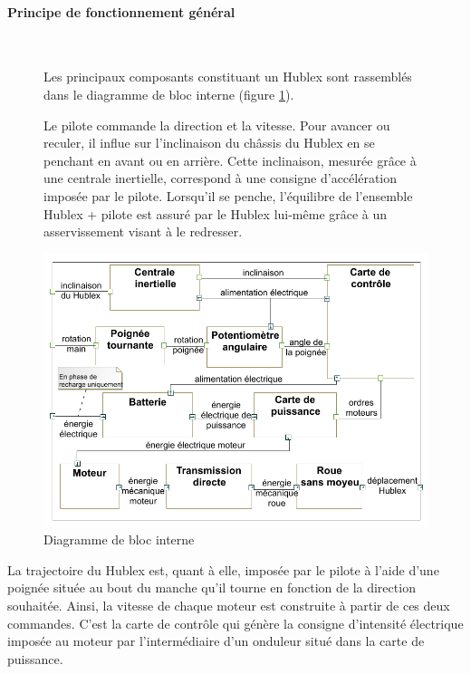 \paragraph{Principe de fonctionnement général}

~\

\begin{figure}[h!]
 \begin{minipage}{0.4\linewidth}
Les principaux composants constituant un Hublex sont rassemblés dans le diagramme de bloc interne
(figure \ref{fig05}).

Le pilote commande la direction et la vitesse. Pour avancer ou reculer, il influe sur l'inclinaison du
châssis du Hublex en se penchant en avant ou en arrière. Cette inclinaison, mesurée grâce à une centrale inertielle, correspond à une consigne d'accélération imposée par le pilote. Lorsqu'il se penche, l'équilibre de l'ensemble {Hublex + pilote} est assuré par le Hublex lui-même grâce à un asservissement visant à le redresser.
 \end{minipage}\hfill
 \begin{minipage}{0.55\linewidth}
 \includegraphics[width=\linewidth]{img/fig05}
 \caption{\label{fig05}Diagramme de bloc interne}
 \end{minipage}
\end{figure}


La trajectoire du Hublex est, quant à elle, imposée par le pilote à l'aide d'une poignée située au bout
du manche qu'il tourne en fonction de la direction souhaitée. Ainsi, la vitesse de chaque moteur est construite à partir de ces deux commandes. C'est la carte de contrôle qui génère la consigne d'intensité
électrique imposée au moteur par l'intermédiaire d'un onduleur situé dans la carte de puissance.

